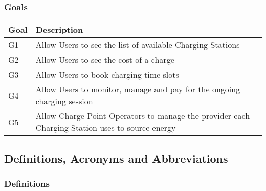 \documentclass[11pt]{article}
\begin{document}

\subsubsection{Goals}

\begin{table}[H]
    \centering
    \setlength{\tabcolsep}{18pt}
    \renewcommand{\arraystretch}{1.2}
    \begin{tabularx}{\textwidth}{|>{\centering\hsize=0.3\hsize}X|>{\hsize=1.7\hsize}X|}
        \hline
        \textbf{Goal} & \textbf{Description} \\
        \hline
        G1 & Allow Users to see the list of available Charging Stations \\
        \hline
        G2 & Allow Users to see the cost of a charge \\
        \hline
        G3 & Allow Users to book charging time slots \\
        \hline
        G4 & Allow Users to monitor, manage and pay for the ongoing charging session \\
        \hline
        G5 & Allow Charge Point Operators to manage the provider each Charging Station uses to source energy \\
        \hline
    \end{tabularx}
    \label{tab:goals}
\end{table}

\subsection{Definitions, Acronyms and Abbreviations}

\subsubsection{Definitions}
\end{document}
